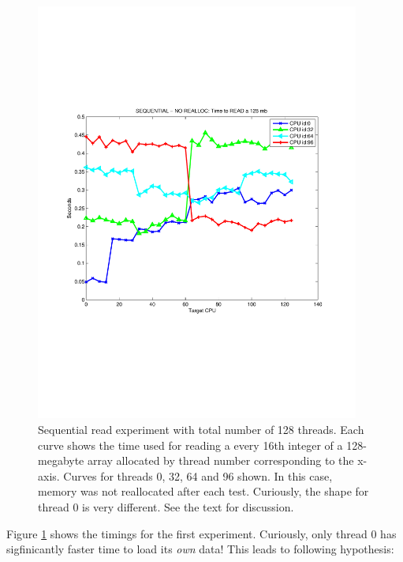 \documentclass[12pt]{article}
\begin{document}
\begin{figure}[H]
\includegraphics[width=0.95\textwidth]{blacklight_seq_access_norealloc.pdf}
\caption{Sequential read experiment with total number of 128 threads. Each curve shows the time used for reading a every 16th integer of a 128-megabyte array allocated by thread number corresponding to the x-axis. Curves for threads 0, 32, 64 and 96 shown. In this case, memory was not reallocated after each test. Curiously, the shape for thread 0 is very different. See the text for discussion.
}
\label{figseq1}
\end{figure}

Figure \ref{figseq1} shows the timings for the first experiment. Curiously, only thread 0 has sigfinicantly faster time to load its \emph{own} data!  This leads to following hypothesis: 


\smallskip
{} \\
\end{document}
